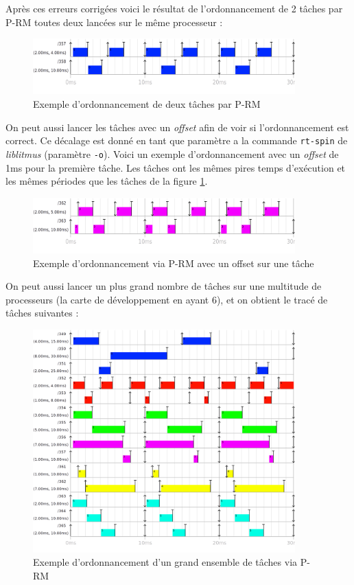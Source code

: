 Après ces erreurs corrigées voici le résultat de l'ordonnancement de 2 tâches par P-RM toutes deux lancées sur le même processeur :

\begin{figure}[H]
    \centering
    \includegraphics[width=0.9\textwidth]{Images/RM-No-Offset.png}
    \caption{Exemple d'ordonnancement de deux tâches par P-RM}
    \label{fig:rm-schedualibility-demo}
\end{figure}


On peut aussi lancer les tâches avec un \textit{offset} afin de voir si l'ordonnancement est correct. Ce décalage est donné en tant que paramètre a la commande \texttt{rt-spin} de \textit{liblitmus} (paramètre \texttt{-o}). Voici un exemple d'ordonnancement avec un \textit{offset} de 1ms pour la première tâche. Les tâches ont les mêmes pires temps d'exécution et les mêmes périodes que les tâches de la figure \ref{fig:rm-schedualibility-demo}.
\begin{figure}[H]
    \centering
    \includegraphics[width=0.9\textwidth]{Images/RM_OFFSET_SCHED.png}
    \caption{Exemple d'ordonnancement via P-RM avec un offset sur une tâche}
\end{figure}

On peut aussi lancer un plus grand nombre de tâches sur une multitude de processeurs (la carte de développement en ayant 6), et on obtient le tracé de tâches suivantes : 

\begin{figure}[H]
    \centering
    \includegraphics[width=0.9\textwidth]{Images/RM-bcp.png}
    \caption{Exemple d'ordonnancement d'un grand ensemble de tâches via P-RM}
\end{figure}


